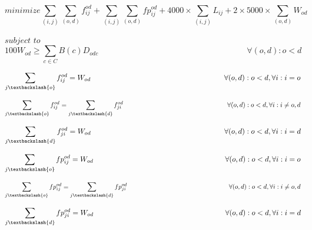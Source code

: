 \begin{equation}
minimize    \sum_{(i,j)} \sum_{(o,d)} f_{ij}^{od} + \sum_{(i,j)} \sum_{(o,d)} fp_{ij}^{od} + 4000 \times \sum_{(i,j)} L_{ij} + 2 \times 5000 \times \sum_{(o,d)} W_{od}
\label{ILPTransp}
\end{equation}

$subject$ $to$
\begin{equation}
100 W_{od} \geq \sum_{c\in C} B\left(c\right) D_{odc} \qquad \qquad \qquad \qquad \qquad \qquad \qquad \qquad \qquad
\forall(o,d) : o < d
\label{ILPTransp0}
\end{equation}

\begin{equation}
\sum_{j\textbackslash \{o\}} f_{ij}^{od} = W_{od}  \qquad \qquad \qquad \qquad \qquad \qquad \qquad \qquad \qquad
\forall(o,d) : o < d, \forall i: i = o
\label{ILPTransp1}
\end{equation}

\begin{equation}
\sum_{j\textbackslash \{o\}} f_{ij}^{od} = \sum_{j\textbackslash \{d\}} f_{ji}^{od} \qquad \qquad \qquad \qquad \qquad \qquad \qquad \qquad
\forall(o,d) : o < d, \forall i: i \neq o,d
\label{ILPTransp2}
\end{equation}

\begin{equation}
\sum_{j\textbackslash \{d\}} f_{ji}^{od} = W_{od}  \qquad \qquad \qquad \qquad \qquad \qquad \qquad \qquad \qquad
\forall(o,d) : o < d, \forall i: i = d
\label{ILPTransp3}
\end{equation}

\begin{equation}
\sum_{j\textbackslash \{o\}} fp_{ij}^{od} = W_{od} \qquad \qquad \qquad \qquad \qquad \qquad \qquad \qquad \qquad
\forall(o,d) : o < d, \forall i: i = o
\label{ILPTransp1p}
\end{equation}

\begin{equation}
\sum_{j\textbackslash \{o\}} fp_{ij}^{od} = \sum_{j\textbackslash \{d\}} fp_{ji}^{od} \qquad \qquad \qquad \qquad \qquad \qquad \qquad \qquad
\forall(o,d) : o < d, \forall i: i \neq o,d
\label{ILPTransp2p}
\end{equation}

\begin{equation}
\sum_{j\textbackslash \{d\}} fp_{ji}^{od} = W_{od} \qquad \qquad \qquad \qquad \qquad \qquad \qquad \qquad \qquad
\forall(o,d) : o < d, \forall i: i = d
\label{ILPTransp3p}
\end{equation}

